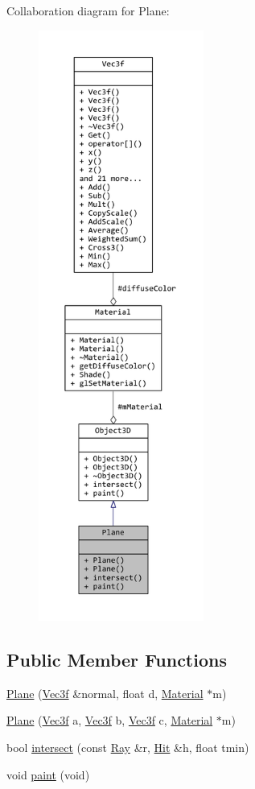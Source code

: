 Collaboration diagram for Plane\+:
\nopagebreak
\begin{figure}[H]
\begin{center}
\leavevmode
\includegraphics[height=550pt]{classPlane__coll__graph}
\end{center}
\end{figure}
\subsection*{Public Member Functions}
\begin{DoxyCompactItemize}
\item 
\hyperlink{classPlane_a03b8454ad8a2449db6b17f16e5937f30}{Plane} (\hyperlink{classVec3f}{Vec3f} \&normal, float d, \hyperlink{classMaterial}{Material} $\ast$m)
\item 
\hyperlink{classPlane_a0635018b797d1d6bad2ba7b77d5bb850}{Plane} (\hyperlink{classVec3f}{Vec3f} a, \hyperlink{classVec3f}{Vec3f} b, \hyperlink{classVec3f}{Vec3f} c, \hyperlink{classMaterial}{Material} $\ast$m)
\item 
bool \hyperlink{classPlane_aa5d49b08c1d2bd97f62ede89dccc7298}{intersect} (const \hyperlink{classRay}{Ray} \&r, \hyperlink{classHit}{Hit} \&h, float tmin)
\item 
void \hyperlink{classPlane_a07d23e6d410f03bb716bbcc5366323c7}{paint} (void)
\end{DoxyCompactItemize}
